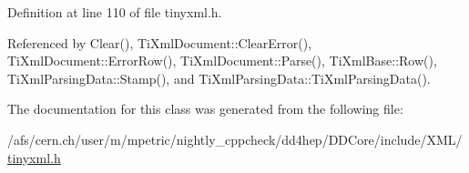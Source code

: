 Definition at line 110 of file tinyxml.h.

Referenced by Clear(), TiXmlDocument::ClearError(), TiXmlDocument::ErrorRow(), TiXmlDocument::Parse(), TiXmlBase::Row(), TiXmlParsingData::Stamp(), and TiXmlParsingData::TiXmlParsingData().

The documentation for this class was generated from the following file:\begin{DoxyCompactItemize}
\item 
/afs/cern.ch/user/m/mpetric/nightly\_\-cppcheck/dd4hep/DDCore/include/XML/\hyperlink{tinyxml_8h}{tinyxml.h}\end{DoxyCompactItemize}
